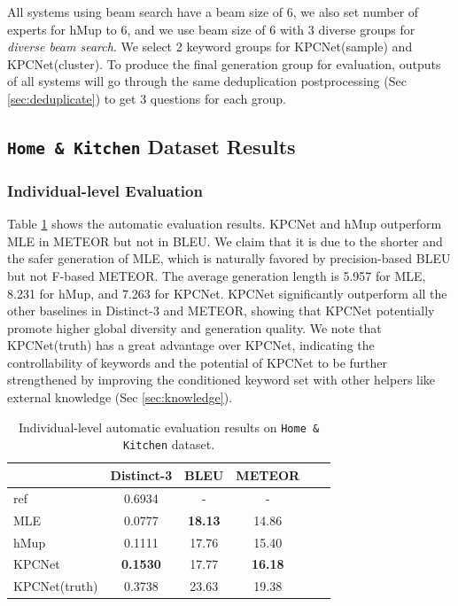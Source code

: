 \documentclass[letterpaper]{article} %
\begin{document}
All systems using beam search have a beam size of 6, we also set number of experts for hMup to 6, and we use beam size of 6 with 3 diverse groups for \textit{diverse beam search}. We select 2 keyword groups for KPCNet(sample) and KPCNet(cluster). To produce the final generation group for evaluation, outputs of all systems will go through the same deduplication postprocessing (Sec \ref{sec:deduplicate}) to get 3 questions for each group.

\subsection{\texttt{Home \& Kitchen} Dataset Results}

\subsubsection{Individual-level Evaluation}

Table \ref{tab:ind-auto-eval} shows the automatic evaluation results. KPCNet and hMup outperform MLE in METEOR but not in BLEU. We claim that it is due to the shorter and the safer generation of MLE, which is naturally favored by precision-based BLEU but not F-based METEOR. The average generation length is 5.957 for MLE, 8.231 for hMup, and 7.263 for KPCNet. KPCNet significantly outperform all the other baselines in Distinct-3 and METEOR, showing that KPCNet potentially promote higher global diversity and generation quality. We note that KPCNet(truth) has a great advantage over KPCNet, indicating the controllability of keywords and the potential of KPCNet to be further strengthened by improving the conditioned keyword set with other helpers like external knowledge (Sec \ref{sec:knowledge}).

\begin{table}[h]
  \small
  \centering
  \begin{tabular}{l|ccccc}
  \hline
  {} & Distinct-3 & BLEU & METEOR \\
  \hline
  ref  &        0.6934 &        - &    - \\
  \hline
  MLE &        0.0777 &  \textbf{18.13} & 14.86 \\
  hMup &        0.1111 &  17.76 &    15.40  \\
  KPCNet &        \textbf{0.1530} &     17.77 &    \textbf{16.18}  \\
  \hline
  KPCNet(truth) &        0.3738 &     23.63 &    19.38  \\
  \hline
  \end{tabular}
  \caption{\label{tab:ind-auto-eval} Individual-level automatic evaluation results on \texttt{Home \& Kitchen} dataset.}
\end{table}
\end{document}
